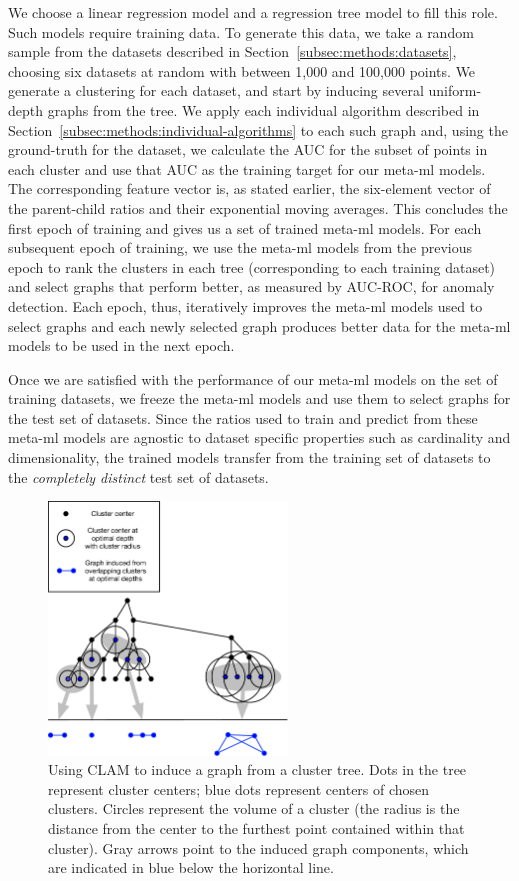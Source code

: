 We choose a linear regression model and a regression tree model to fill this role.
Such models require training data.
To generate this data, we take a random sample from the datasets described in Section~\ref{subsec:methods:datasets}, choosing six datasets at random with between 1,000 and 100,000 points.
We generate a clustering for each dataset, and start by inducing several uniform-depth graphs from the tree.
We apply each individual algorithm described in Section~\ref{subsec:methods:individual-algorithms} to each such graph and, using the ground-truth for the dataset, we calculate the AUC for the subset of points in each cluster and use that AUC as the training target for our meta-ml models.
The corresponding feature vector is, as stated earlier, the six-element vector of the parent-child ratios and their exponential moving averages.
This concludes the first epoch of training and gives us a set of trained meta-ml models.
For each subsequent epoch of training, we use the meta-ml models from the previous epoch to rank the clusters in each tree (corresponding to each training dataset) and select graphs that perform better, as measured by AUC-ROC, for anomaly detection.
Each epoch, thus, iteratively improves the meta-ml models used to select graphs and each newly selected graph produces better data for the meta-ml models to be used in the next epoch.

Once we are satisfied with the performance of our meta-ml models on the set of training datasets, we freeze the meta-ml models and use them to select graphs for the test set of datasets.
Since the ratios used to train and predict from these meta-ml models are agnostic to dataset specific properties such as cardinality and dimensionality, the trained models transfer from the training set of datasets to the \textit{completely distinct} test set of datasets.

\begin{figure}[ht!]
    \centering
    \includegraphics[width=2.5in]{images/tree-graph.pdf}
    \caption{Using CLAM to induce a graph from a cluster tree.
        Dots in the tree represent cluster centers;
        blue dots represent centers of chosen clusters.
        Circles represent the volume of a cluster (the radius is the distance from the center to the furthest point contained within that cluster).
        Gray arrows point to the induced graph components, which are indicated in blue below the horizontal line.}
    \label{fig:methods:graph-generation}
\end{figure}


